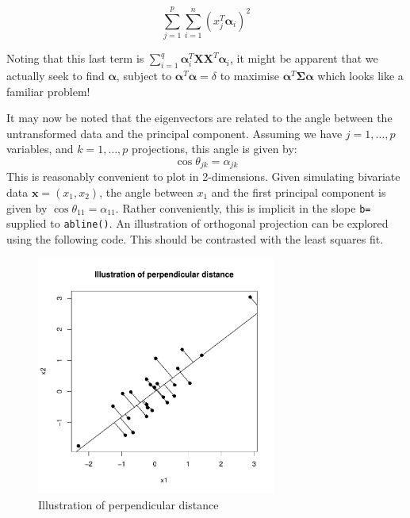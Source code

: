 \begin{displaymath}
\sum_{j=1}^{p} \sum_{i=1}^{n} (x_{j}^{T}\boldsymbol{\alpha}_{i})^{2}
\end{displaymath}

Noting that this last term is $\sum_{i=1}^{q} \boldsymbol{\alpha}_{i}^{T} \boldsymbol{X}\boldsymbol{X}^{T} \boldsymbol{\alpha}_{i}$, it might be apparent that we actually seek to find $\boldsymbol{\alpha}$, subject to $\boldsymbol{\alpha}^{T}\boldsymbol{\alpha} = \delta$ to maximise $\boldsymbol{\alpha}^{T}\boldsymbol{\Sigma}\boldsymbol{\alpha}$ which looks like a familiar problem!

It may now be noted that the eigenvectors are related to the angle between the untransformed data and the principal component.   Assuming we have $j = 1, \ldots, p$ variables, and $k = 1, \ldots, p$ projections, this angle is given by:
\begin{equation}
\cos \theta_{jk} = \alpha_{jk}
\end{equation}
This is reasonably convenient to plot in 2-dimensions.   Given simulating bivariate data $\boldsymbol{x} = (x_{1}, x_{2})$, the angle between $x_{1}$ and the first principal component is given by $\cos \theta_{11} = \alpha_{11}$.   Rather conveniently, this is implicit in the slope \verb+b=+ supplied to \verb+abline()+.   An illustration of orthogonal projection can be explored using the following code.   This should be contrasted with the least squares fit.

\begin{figure}
\includegraphics[width = 0.7\textwidth]{images/ProjDist}
\caption{Illustration of perpendicular distance}
\label{projection}
\end{figure}

